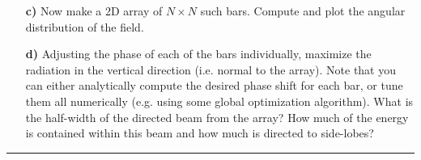 \documentclass[11pt]{article}
\begin{document}
\begin{enumerate}
\begin{itemize}
\item[\bf c)] Now make a 2D array of $N \times N$ such bars. Compute and plot the angular distribution of the field.

\item[\bf d)] Adjusting the phase of each of the bars individually, maximize the radiation in the vertical direction (i.e. normal to the array). Note that you can either analytically compute the desired phase shift for each bar, or tune them all numerically (e.g. using some global optimization algorithm). What is the half-width of the directed beam from the array? How much of the energy is contained within this beam and how much is directed to side-lobes?

\end{itemize}



\end{enumerate}

\bigskip
{\color{Sepia} \hrule}
\end{document}
